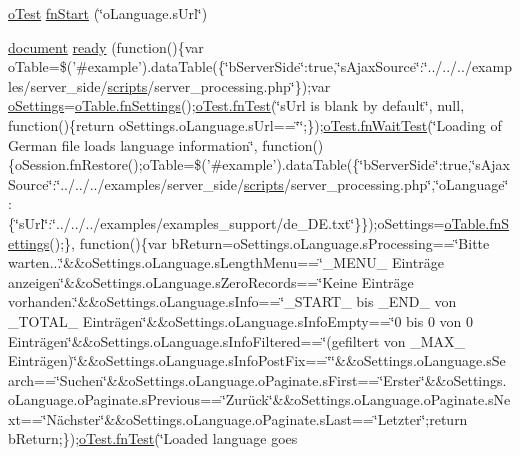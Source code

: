 \begin{DoxyCompactItemize}
\item 
\hyperlink{unit__test_8js_a3b2d259e2df3b6860d9047a92d09d0d6}{o\+Test} \hyperlink{4__server-side_2o_language_8s_url_8js_ab5c6303f5727ff6597688a464f093972}{fn\+Start} (\char`\"{}o\+Language.\+s\+Url\char`\"{})
\item 
\hyperlink{outside_events_8js_aa14f8e0338cced6720590fd2ea13bd4b}{document} \hyperlink{4__server-side_2o_language_8s_url_8js_a208a116e1ab8be708aeb749a16d6f8b3}{ready} (function()\{var o\+Table=\$('\#example').data\+Table(\{\char`\"{}b\+Server\+Side\char`\"{}\+:true,\char`\"{}s\+Ajax\+Source\char`\"{}\+:\char`\"{}../../../examples/server\+\_\+side/\hyperlink{tinymce_8jquery_8dev_8js_a09066d4d580eeec222f858d588b4cdef}{scripts}/server\+\_\+processing.\+php\char`\"{}\});var \hyperlink{model_8settings_8js_a4857b9c813b4dea010668e9555d0aca7}{o\+Settings}=\hyperlink{api_8methods_8js_a78f387fab92a85c2cb7830bc5d8a6141}{o\+Table.\+fn\+Settings}();\hyperlink{__zero__config__objects__subarrays_8js_a7f100cfe8617a03cd30c47b5e15396a4}{o\+Test.\+fn\+Test}(\char`\"{}s\+Url is blank by default\char`\"{}, null, function()\{return o\+Settings.\+o\+Language.\+s\+Url==\char`\"{}\char`\"{};\});\hyperlink{onhold_24__server-side_2__zero__config_8js_ab25c4d596771c0133cdc45178ce72c3d}{o\+Test.\+fn\+Wait\+Test}(\char`\"{}Loading of German file loads language information\char`\"{}, function()\{o\+Session.\+fn\+Restore();o\+Table=\$('\#example').data\+Table(\{\char`\"{}b\+Server\+Side\char`\"{}\+:true,\char`\"{}s\+Ajax\+Source\char`\"{}\+:\char`\"{}../../../examples/server\+\_\+side/\hyperlink{tinymce_8jquery_8dev_8js_a09066d4d580eeec222f858d588b4cdef}{scripts}/server\+\_\+processing.\+php\char`\"{},\char`\"{}o\+Language\char`\"{}\+:\{\char`\"{}s\+Url\char`\"{}\+:\char`\"{}../../../examples/examples\+\_\+support/de\+\_\+\+D\+E.\+txt\char`\"{}\}\});o\+Settings=\hyperlink{api_8methods_8js_a78f387fab92a85c2cb7830bc5d8a6141}{o\+Table.\+fn\+Settings}();\}, function()\{var b\+Return=o\+Settings.\+o\+Language.\+s\+Processing==\char`\"{}Bitte warten...\char`\"{}\&\&o\+Settings.\+o\+Language.\+s\+Length\+Menu==\char`\"{}\+\_\+\+M\+E\+N\+U\+\_\+ Einträge anzeigen\char`\"{}\&\&o\+Settings.\+o\+Language.\+s\+Zero\+Records==\char`\"{}Keine Einträge vorhanden.\char`\"{}\&\&o\+Settings.\+o\+Language.\+s\+Info==\char`\"{}\+\_\+\+S\+T\+A\+R\+T\+\_\+ bis \+\_\+\+E\+N\+D\+\_\+ von \+\_\+\+T\+O\+T\+A\+L\+\_\+ Einträgen\char`\"{}\&\&o\+Settings.\+o\+Language.\+s\+Info\+Empty==\char`\"{}0 bis 0 von 0 Einträgen\char`\"{}\&\&o\+Settings.\+o\+Language.\+s\+Info\+Filtered==\char`\"{}(gefiltert von \+\_\+\+M\+A\+X\+\_\+  Einträgen)\char`\"{}\&\&o\+Settings.\+o\+Language.\+s\+Info\+Post\+Fix==\char`\"{}\char`\"{}\&\&o\+Settings.\+o\+Language.\+s\+Search==\char`\"{}Suchen\char`\"{}\&\&o\+Settings.\+o\+Language.\+o\+Paginate.\+s\+First==\char`\"{}Erster\char`\"{}\&\&o\+Settings.\+o\+Language.\+o\+Paginate.\+s\+Previous==\char`\"{}Zurück\char`\"{}\&\&o\+Settings.\+o\+Language.\+o\+Paginate.\+s\+Next==\char`\"{}Nächster\char`\"{}\&\&o\+Settings.\+o\+Language.\+o\+Paginate.\+s\+Last==\char`\"{}Letzter\char`\"{};return b\+Return;\});\hyperlink{__zero__config__objects__subarrays_8js_a7f100cfe8617a03cd30c47b5e15396a4}{o\+Test.\+fn\+Test}(\char`\"{}Loaded language goes 
\end{DoxyCompactItemize}
